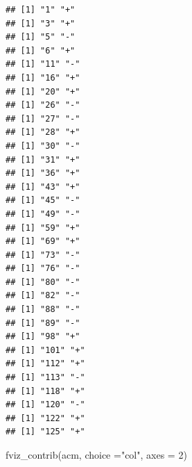 \documentclass[
]{article}
\newenvironment{Shaded}{\begin{snugshade}}{\end{snugshade}}
\newcommand{\AttributeTok}[1]{\textcolor[rgb]{0.77,0.63,0.00}{#1}}
\newcommand{\ControlFlowTok}[1]{\textcolor[rgb]{0.13,0.29,0.53}{\textbf{#1}}}
\newcommand{\DecValTok}[1]{\textcolor[rgb]{0.00,0.00,0.81}{#1}}
\newcommand{\FunctionTok}[1]{\textcolor[rgb]{0.00,0.00,0.00}{#1}}
\newcommand{\NormalTok}[1]{#1}
\newcommand{\SpecialCharTok}[1]{\textcolor[rgb]{0.00,0.00,0.00}{#1}}
\newcommand{\StringTok}[1]{\textcolor[rgb]{0.31,0.60,0.02}{#1}}
\begin{document}
\begin{Shaded}
\end{Shaded}

\begin{verbatim}
## [1] "1" "+"
## [1] "3" "+"
## [1] "5" "-"
## [1] "6" "+"
## [1] "11" "-" 
## [1] "16" "+" 
## [1] "20" "+" 
## [1] "26" "-" 
## [1] "27" "-" 
## [1] "28" "+" 
## [1] "30" "-" 
## [1] "31" "+" 
## [1] "36" "+" 
## [1] "43" "+" 
## [1] "45" "-" 
## [1] "49" "-" 
## [1] "59" "+" 
## [1] "69" "+" 
## [1] "73" "-" 
## [1] "76" "-" 
## [1] "80" "-" 
## [1] "82" "-" 
## [1] "88" "-" 
## [1] "89" "-" 
## [1] "98" "+" 
## [1] "101" "+"  
## [1] "112" "+"  
## [1] "113" "-"  
## [1] "118" "+"  
## [1] "120" "-"  
## [1] "122" "+"  
## [1] "125" "+"
\end{verbatim}

\begin{Shaded}
\begin{Highlighting}[]
\FunctionTok{fviz\_contrib}\NormalTok{(acm, }\AttributeTok{choice =}\StringTok{"col"}\NormalTok{, }\AttributeTok{axes =} \DecValTok{2}\NormalTok{)}
\end{Highlighting}
\end{Shaded}
\end{document}
